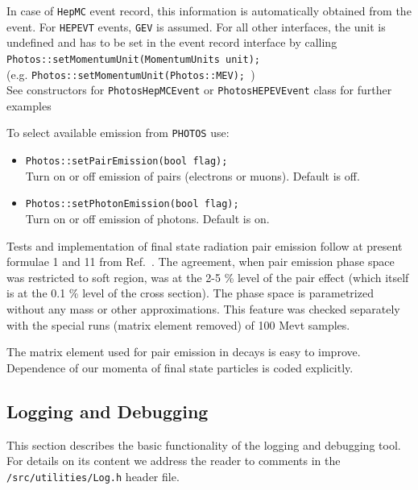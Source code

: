\documentclass[]{Photos_interface_design}
\begin{document}
In case of {\tt HepMC} event record, this information is automatically obtained
from the event. For {\tt HEPEVT} events, {\tt GEV} is assumed. For all other
interfaces, the unit is undefined and has to be set in the event record
interface by calling \\ {\tt Photos::setMomentumUnit(MomentumUnits unit); }\\
(e.g. {\tt Photos::setMomentumUnit(Photos::MEV); })
\\ See
constructors for {\tt PhotosHepMCEvent} or {\tt PhotosHEPEVEvent} class for
further examples

To select available emission from {\tt PHOTOS} use:

\begin{itemize}
  \item {\tt Photos::setPairEmission(bool flag); } \\
        Turn on or off emission of pairs (electrons or muons). Default is off.
  \item {\tt Photos::setPhotonEmission(bool flag); } \\
        Turn on or off emission of photons. Default is on.
\end{itemize}

Tests and implementation of final state radiation 
pair emission follow at present formulae 1 and 11 from Ref.~\cite{Jadach:1993wk}. 
The agreement, when pair emission phase space was restricted to soft region, was  at the   2-5 \% 
level of the pair effect (which itself is at the 0.1 \% level of the cross section). 
The phase space  is parametrized without any mass or other approximations. This feature 
was checked separately with  the special runs (matrix element removed) of 100 Mevt samples.

The matrix element used for pair emission in decays is easy to improve. 
Dependence of our momenta of final state particles is coded 
explicitly. 
\subsection{Logging and Debugging}
\label{App:Logging}
This section describes the basic functionality of the logging and debugging tool.
For details on its content we address the reader to comments in the {\tt /src/utilities/Log.h} header file.
\end{document}
